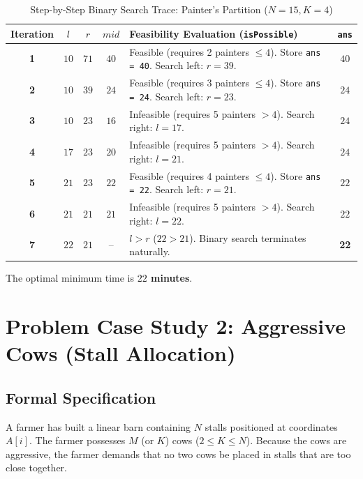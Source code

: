\documentclass[10pt,journal,compsoc,onecolumn]{IEEEtran}
\begin{document}
\begin{table}[h]
\centering
\caption{Step-by-Step Binary Search Trace: Painter's Partition ($N = 15, K = 4$)}
\label{tab:painters_trace}
\begin{tabular}{@{}cccclc@{}}
\toprule
\textbf{Iteration} & $l$ & $r$ & $mid$ & \textbf{Feasibility Evaluation (\texttt{isPossible})} & \texttt{ans} \\ \midrule
\textbf{1} & $10$ & $71$ & $40$ & Feasible (requires 2 painters $\le 4$). Store \texttt{ans = 40}. Search left: $r = 39$. & $40$ \\
\textbf{2} & $10$ & $39$ & $24$ & Feasible (requires 3 painters $\le 4$). Store \texttt{ans = 24}. Search left: $r = 23$. & $24$ \\
\textbf{3} & $10$ & $23$ & $16$ & Infeasible (requires 5 painters $> 4$). Search right: $l = 17$. & $24$ \\
\textbf{4} & $17$ & $23$ & $20$ & Infeasible (requires 5 painters $> 4$). Search right: $l = 21$. & $24$ \\
\textbf{5} & $21$ & $23$ & $22$ & Feasible (requires 4 painters $\le 4$). Store \texttt{ans = 22}. Search left: $r = 21$. & $22$ \\
\textbf{6} & $21$ & $21$ & $21$ & Infeasible (requires 5 painters $> 4$). Search right: $l = 22$. & $22$ \\
\textbf{7} & $22$ & $21$ & -- & $l > r$ ($22 > 21$). Binary search terminates naturally. & \textbf{22} \\ \bottomrule
\end{tabular}
\end{table}

The optimal minimum time is \textbf{$22$ minutes}.

\section{Problem Case Study 2: Aggressive Cows (Stall Allocation)}
\label{sec:cows}

\subsection{Formal Specification}

A farmer has built a linear barn containing $N$ stalls positioned at coordinates $A[i]$. The farmer possesses $M$ (or $K$) cows ($2 \le K \le N$). Because the cows are aggressive, the farmer demands that no two cows be placed in stalls that are too close together.
\end{document}
